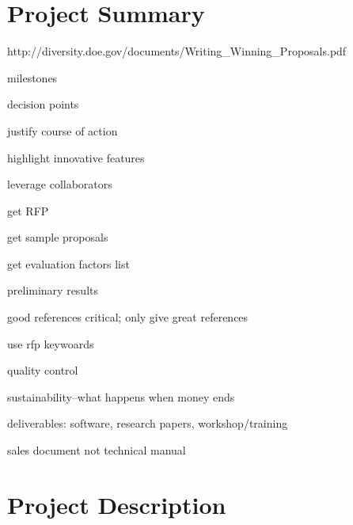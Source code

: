 \documentclass{article}
\begin{document}

\section{Project Summary} \label{s:summary}



http://diversity.doe.gov/documents/Writing_Winning_Proposals.pdf

milestones

decision points

justify course of action

highlight innovative features

leverage collaborators

get RFP

get sample proposals

get evaluation factors list

preliminary results

good references critical; only give great references

use rfp keywoards

quality control

sustainability--what happens when money ends

deliverables: software, research papers, workshop/training

sales document not technical manual


\section{Project Description} \label{s:description}
\end{document}
